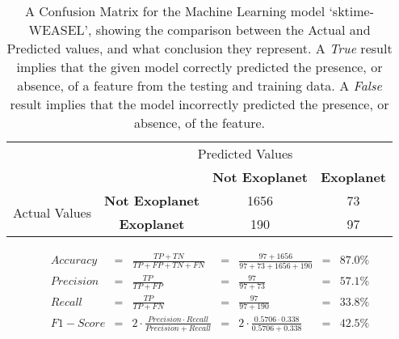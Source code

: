 
    \renewcommand{\arraystretch}{2}
    \renewcommand{\tabcolsep}{20.25pt}
    \vspace{-0.5cm}
    \begin{table}[ht]
    \begin{tabular}{cccc}
     & \multicolumn{3}{c}{Predicted Values} \\ \cline{3-4}
     & \multicolumn{1}{c|}{} & \multicolumn{1}{c|}{\textbf{Not Exoplanet}} & \multicolumn{1}{c|}{\textbf{Exoplanet}} \\ \cline{2-4}
    \multicolumn{1}{c|}{\multirow{2}{2.0cm}{Actual Values}} & \multicolumn{1}{c|}{\textbf{Not Exoplanet}} & \multicolumn{1}{c|}{1656} & \multicolumn{1}{c|}{73} \\ \cline{2-4}
    \multicolumn{1}{c|}{} & \multicolumn{1}{c|}{\textbf{Exoplanet}} & \multicolumn{1}{c|}{190} & \multicolumn{1}{c|}{97} \\ \cline{2-4}
    \end{tabular}
    \caption{A Confusion Matrix for the Machine Learning model `sktime-WEASEL', showing the comparison between the Actual and Predicted values, and what conclusion they represent. A \emph{True} result implies that the given model correctly predicted the presence, or absence, of a feature from the testing and training data. A \emph{False} result implies that the model incorrectly predicted the presence, or absence, of the feature.}
    \label{tab:sktime-WEASELconfusionmatrix}
    \end{table}
    \vspace{-0.75cm}
    \label{eq:metrics-sktime-WEASEL}
    \begin{align*}
        Accuracy &= &\frac{TP + TN}{TP + FP + TN + FN} &= &\frac{97 + 1656}{97 + 73 + 1656 + 190} &= & 87.0\% \\
        Precision &= &\frac{TP}{TP + FP} &= &\frac{97}{97 + 73} &= & 57.1\% \\
        Recall &= &\frac{TP}{TP + FN} &= &\frac{97}{97 + 190} &= & 33.8\% \\
        F1-Score &= &2 \cdot \frac{Precision \cdot Recall}{Precision + Recall} &= &2 \cdot \frac{0.5706 \cdot 0.338}{0.5706 + 0.338} &= & 42.5\% \\
    \end{align*}
    \vspace{-1.75cm}
    \renewcommand{\arraystretch}{1}
    \renewcommand{\tabcolsep}{5.25pt}
    